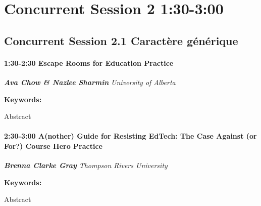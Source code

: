 \documentclass[
]{book}
\begin{document}
\hypertarget{concurrent-session-2-130-300}{%
\section*{Concurrent Session 2 \textbar{} 1:30-3:00}\label{concurrent-session-2-130-300}}

\hypertarget{concurrent-session-2.1-wildcard}{%
\subsection*{Concurrent Session 2.1 \textbar{} Caractère générique}\label{concurrent-session-2.1-wildcard}}

\begin{session}
\hypertarget{escape-rooms-for-education-practice}{%
\paragraph*{\texorpdfstring{1:30-2:30 \textbar{} \textbf{Escape Rooms
for Education} \textbar{}
Practice}{1:30-2:30 \textbar{} Escape Rooms for Education \textbar{} Practice}}\label{escape-rooms-for-education-practice}}

\textbf{\emph{Ava Chow \& Nazlee Sharmin}} \textbar{} \emph{University
of Alberta}

\textbf{Keywords:}

Abstract
\end{session}

\begin{session}
\hypertarget{another-guide-for-resisting-edtech-the-case-against-or-for-course-hero-practice}{%
\paragraph*{\texorpdfstring{2:30-3:00 \textbar{} \textbf{A(nother) Guide
for Resisting EdTech: The Case Against (or For?) Course Hero} \textbar{}
Practice}{2:30-3:00 \textbar{} A(nother) Guide for Resisting EdTech: The Case Against (or For?) Course Hero \textbar{} Practice}}\label{another-guide-for-resisting-edtech-the-case-against-or-for-course-hero-practice}}

\textbf{\emph{Brenna Clarke Gray}} \textbar{} \emph{Thompson Rivers
University}

\textbf{Keywords:}

Abstract
\end{session}
\end{document}
